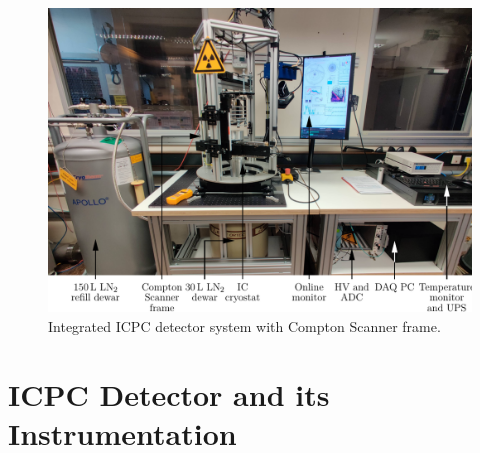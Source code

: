 \begin{figure}[htb]
    \centering
    \includegraphics[width=6in]{figs/integration/full_setup_labeled_width_6_9.pdf}
    \caption{Integrated ICPC detector system with Compton Scanner frame.}
    \label{fig:full_setup}
\end{figure}

\section{ICPC Detector and its Instrumentation} \label{sec:ic_det_intru}

